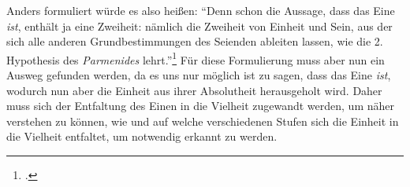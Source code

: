 Anders formuliert würde es also heißen:
\enquote{Denn schon die Aussage, dass das Eine \emph{ist}, enthält ja eine Zweiheit: nämlich die Zweiheit von Einheit und Sein, aus der sich alle anderen Grundbestimmungen des Seienden ableiten lassen, wie die 2. Hypothesis des \emph{Parmenides} lehrt.}\footcite[][S. 136f.]{halfwassen2015spuren}
Für diese Formulierung muss aber nun ein Ausweg gefunden werden, da es uns nur möglich ist zu sagen, dass das Eine \emph{ist}, wodurch nun aber die Einheit aus ihrer Absolutheit herausgeholt wird. Daher muss sich der Entfaltung des Einen in die Vielheit zugewandt werden, um näher verstehen zu können, wie und auf welche verschiedenen Stufen sich die Einheit in die Vielheit entfaltet, um notwendig erkannt zu werden.

